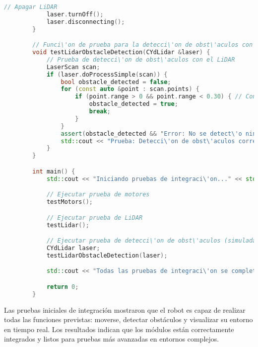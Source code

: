 \begin{lstlisting}[language={C++}, caption={C\'odigo de pruebas de integraci\'organismo}, label={Script}]
            // Apagar LiDAR
            laser.turnOff();
            laser.disconnecting();
        }

        // Funci\'on de prueba para la detecci\'on de obst\'aculos con LiDAR
        void testLidarObstacleDetection(CYdLidar &laser) {
            // Prueba de detecci\'on de obst\'aculos con el LiDAR
            LaserScan scan;
            if (laser.doProcessSimple(scan)) {
                bool obstacle_detected = false;
                for (const auto &point : scan.points) {
                    if (point.range > 0 && point.range < 0.30) { // Condici\'on de obst\'aculo
                        obstacle_detected = true;
                        break;
                    }
                }
                assert(obstacle_detected && "Error: No se detect\'o ning\'un obst\'aculo cuando se esperaba.");
                std::cout << "Prueba: Detecci\'on de obst\'aculos correcta." << std::endl;
            }
        }

        int main() {
            std::cout << "Iniciando pruebas de integraci\'on..." << std::endl;

            // Ejecutar prueba de motores
            testMotors();

            // Ejecutar prueba de LiDAR
            testLidar();

            // Ejecutar prueba de detecci\'on de obst\'aculos (simulada)
            CYdLidar laser;
            testLidarObstacleDetection(laser);

            std::cout << "Todas las pruebas de integraci\'on se completaron correctamente." << std::endl;

            return 0;
        }


    \end{lstlisting}
    Las pruebas iniciales de integraci\'on mostraron que el robot es capaz de realizar todas
        las funciones previstas: moverse, detectar obst\'aculos y visualizar su entorno en
        tiempo real. Los resultados indican que los m\'odulos est\'an correctamente integrados
        y listos para pruebas m\'as avanzadas en entornos complejos.
    \vskip 0.5cm
